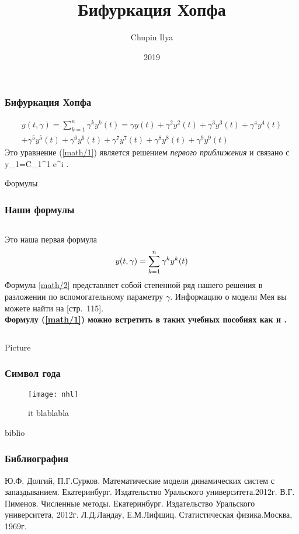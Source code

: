 \documentclass[12pt]{beamer}
\title{Бифуркация Хопфа}
\author{Chupin Ilya}
\institute{Ural Federal University}
\date{2019}
\newcommand{\bla}{blablabla}
\newcommand{\y}{y_1=C_1^1 e^{i \nu \tau} }
\begin{document}
\frame{\titlepage}
\begin{frame}
\frametitle{Бифуркация Хопфа}
 \begin{multline}
      y(t,\gamma)=\sum_{k=1}^n \gamma^k y^k (t)= \gamma y(t)+\gamma^2 y^2(t)+\gamma^3 y^3(t)+\gamma^4 y^4 (t)\\  + \gamma^5 y^5(t)+\gamma^6 y^6(t) +\gamma^7 y^7(t) +\gamma^8 y^8(t)+\gamma^9 y^9(t)
 \label{math/1}
  \end{multline}
Это уравнение (\ref{math/1}) является решением \emph{ первого приближения } и связано с \y. 
\end{frame}
\begin{frame}{Формулы}
    \frametitle{Наши формулы}
    \begin{columns}
   \small{ Это наша первая формула}\\
    \begin{multline}
    \small{  y(t,\gamma)=\sum_{k=1}^n \gamma^k y^k (t)}
 \label{math/2}
  \end{multline}
  Формула \ref{math/2} представляет собой степенной ряд нашего решения в разложении по вспомогательному параметру $\gamma $. Информацию о модели Мея вы можете найти на \cite{Dolgiy}[стр.~115].\\
\textbf{ Формулу (\ref{math/1}) можно встретить в таких учебных пособиях как \cite{Pimenov} и \cite{landau}.}
    \end{columns}
\end{frame}
\begin{frame}{Picture}
    \frametitle{Символ года}
    \begin{figure}
    \centering
    \texttt{[image: nhl]}
    \caption{it \bla}
    \label{picture1}
\end{figure}
\end{frame}
\begin{frame}{biblio}
    \frametitle{Библиография}
    \begin{thebibliography}{5}
    Ю.Ф. Долгий, П.Г.Сурков. Математические модели динамических систем с запаздыванием. Екатеринбург. Издательство Уральского университета.2012г.
    В.Г. Пименов. Численные методы. Екатеринбург. Издательство Уральского университета, 2012г.
    Л.Д.Ландау, Е.М.Лифшиц. Статистическая физика.Москва, 1969г.
    \end{thebibliography}
    \end{frame}
\end{document}
